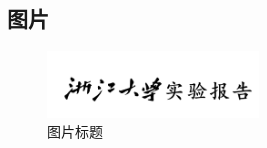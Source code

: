 \documentclass[UTF8]{ctexart}
\begin{document}
\subsection{图片}
\begin{figure}[htbp]
    \centering
    \includegraphics[width=0.5\textwidth]{img.png}
    \caption{图片标题}
    \label{fig:1}
\end{figure}
\end{document}
